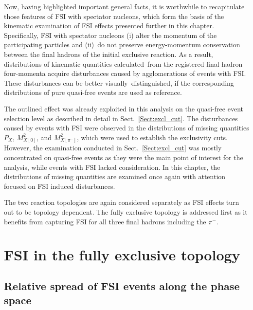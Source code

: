 Now, having highlighted important general facts, it is worthwhile to recapitulate those features of FSI with spectator nucleons, which form the basis of the kinematic examination of FSI effects presented further in this chapter. Specifically, FSI with spectator nucleons (i) alter the momentum of the participating particles and (ii)~do not preserve energy-momentum conservation between the final hadrons of the initial exclusive reaction. As a result, distributions of kinematic quantities calculated~from the registered final hadron four-momenta acquire disturbances caused by agglomerations of events with FSI. These disturbances can be better visually~distinguished, if the corresponding distributions of pure quasi-free events are used as reference. 


The outlined effect was already exploited in this analysis on the quasi-free event selection level as described in detail in Sect.~\ref{Sect:excl_cut}. The disturbances caused by events with FSI were observed in the distributions of missing quantities $P_{X}$, $M^{2}_{X[0]}$, and $M^{2}_{X[\pi^{-}]}$, which were used to establish the exclusivity cuts. However, the examination conducted in Sect.~\ref{Sect:excl_cut} was mostly concentrated on quasi-free events as they were the main point of interest for the analysis, while events with FSI lacked consideration. In this chapter, the distributions of missing quantities are examined once again with attention focused on FSI induced disturbances.


The two reaction topologies are again considered separately as FSI effects turn out to be topology dependent. The fully exclusive topology is addressed first as it benefits from capturing FSI for all three final hadrons including the $\pi^{-}$. 


\section{FSI in the fully exclusive topology}
\subsection{Relative spread of FSI events along the phase space }

